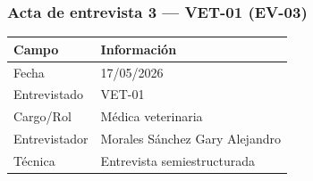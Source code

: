 \documentclass[journal,onecolumn]{IEEEtran}
\begin{document}
\subsubsection*{Acta de entrevista 3 --- VET-01 (EV-03)}

\begin{table}[H]
	\centering\small
	\begin{tabularx}{\textwidth}{@{}l X@{}}
		\toprule
		\textbf{Campo} & \textbf{Información} \\
		\midrule
		
		Fecha & 17/05/2026 \\
		
		Entrevistado & VET-01 \\
		
		Cargo/Rol & Médica veterinaria \\
		
		Entrevistador & Morales Sánchez Gary Alejandro \\
		
		Técnica & Entrevista semiestructurada \\
		
		\bottomrule
	\end{tabularx}
\end{table}
\end{document}
